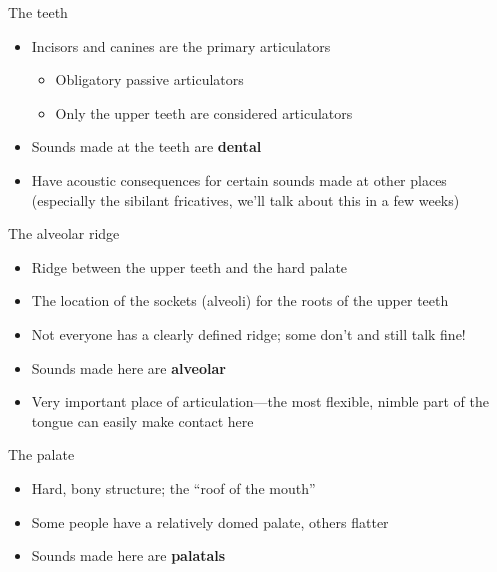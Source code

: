 \documentclass[professionalfonts]{beamer}
\begin{document}
\begin{frame}{The teeth}
    \begin{itemize}
        \item Incisors and canines are the primary articulators
        \begin{itemize}
            \item Obligatory passive articulators
            \item Only the upper teeth are considered articulators
        \end{itemize}
        \item Sounds made at the teeth are \textbf{dental}
            \item Have acoustic consequences for certain sounds made at other places (especially the sibilant fricatives, we'll talk about this in a few weeks)
    \end{itemize}
\end{frame}

\begin{frame}{The alveolar ridge}
    \begin{itemize}
        \item Ridge between the upper teeth and the hard palate
        \item The location of the sockets (alveoli) for the roots of the upper teeth
        \item Not everyone has a clearly defined ridge; some don’t and still talk fine!
        \item Sounds made here are \textbf{alveolar}
        \item Very important place of articulation—the most flexible, nimble part of the tongue can easily make contact here
    \end{itemize}
\end{frame}

\begin{frame}{The palate}
    \begin{itemize}
        \item Hard, bony structure; the “roof of the mouth”
        \item Some people have a relatively domed palate, others flatter
        \item Sounds made here are \textbf{palatals}
    \end{itemize}
\end{frame}
\end{document}
